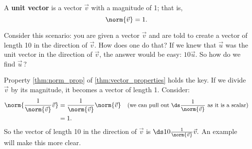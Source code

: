 {A \textbf{unit vector} is a vector $\vec v$ with a magnitude of 1; that is, 
\[\norm{\vec v}=1.\]}

Consider this scenario: you are given a vector $\vec v$ and are told to create a vector of length 10 in the direction of $\vec v$. How does one do that? If we knew that $\vec u$ was the unit vector in the direction of $\vec v$, the answer would be easy: $10\vec u$. So how do we find $\vec u$\,?

Property \ref{thm:norm_prop} of \autoref{thm:vector_properties} holds the key. If we divide $\vec v$ by its magnitude, it becomes a vector of length 1. Consider:
\begin{align*}
	\norm{\frac{1}{\norm{\vec v}}\vec v}
	&= \frac{1}{\norm{\vec v}}\norm{\vec v}
	& \text{\small (we can pull out $\ds \frac{1}{\norm{\vec v}}$ as it is a scalar)}\\
	&= 1.
\end{align*}			
So the vector of length 10 in the direction of $\vec v$ is $\ds 10\frac{1}{\norm{\vec v}}\vec v.$ An example will make this more clear.

